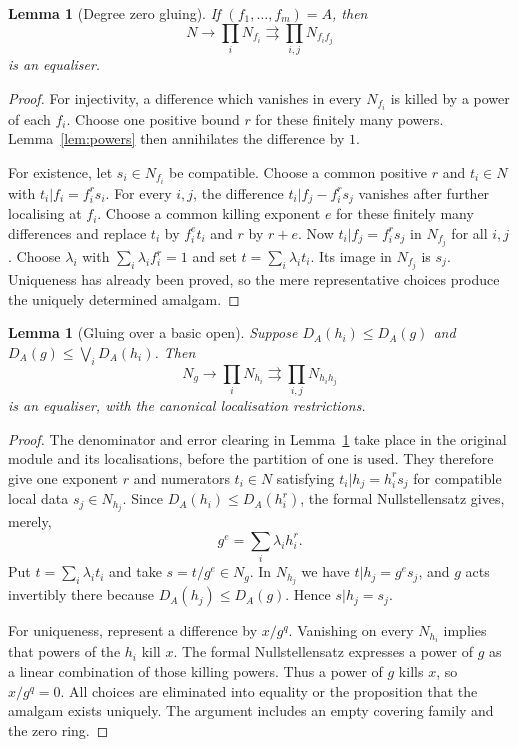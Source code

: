\documentclass[11pt]{amsart}
\newtheorem{lemma}[theorem]{Lemma}
\theoremstyle{definition}\newtheorem{definition}[theorem]{Definition}
\theoremstyle{remark}\newtheorem{remark}[theorem]{Remark}
\begin{document}
\begin{lemma}[Degree zero gluing]\label{lem:h0}
If $(f_1,\ldots,f_m)=A$, then
\[
 N\longrightarrow\prod_i N_{f_i}
 \rightrightarrows\prod_{i,j}N_{f_i f_j}
\]
is an equaliser.
\end{lemma}
\begin{proof}
For injectivity, a difference which vanishes in every $N_{f_i}$ is
killed by a power of each $f_i$. Choose one positive bound $r$ for
these finitely many powers. Lemma~\ref{lem:powers} then annihilates
the difference by $1$.

For existence, let $s_i\in N_{f_i}$ be compatible. Choose a common
positive $r$ and $t_i\in N$ with $t_i|f_i=f_i^r s_i$.
For every $i,j$, the difference
$t_i|f_j-f_i^r s_j$ vanishes after further localising at $f_i$.
Choose a common killing exponent $e$ for these finitely many
differences and replace $t_i$ by $f_i^e t_i$ and $r$ by $r+e$.
Now $t_i|f_j=f_i^r s_j$ in $N_{f_j}$ for all $i,j$.
Choose $\lambda_i$ with $\sum_i\lambda_i f_i^r=1$ and set
$t=\sum_i\lambda_i t_i$. Its image in $N_{f_j}$ is $s_j$.
Uniqueness has already been proved, so the mere representative choices
produce the uniquely determined amalgam.
\end{proof}

\begin{lemma}[Gluing over a basic open]\label{lem:h0relative}
Suppose $D_A(h_i)\le D_A(g)$ and
$D_A(g)\le\bigvee_i D_A(h_i)$. Then
\[
 N_g\longrightarrow\prod_i N_{h_i}
 \rightrightarrows\prod_{i,j}N_{h_i h_j}
\]
is an equaliser, with the canonical localisation restrictions.
\end{lemma}
\begin{proof}
The denominator and error clearing in Lemma~\ref{lem:h0} take place
in the original module and its localisations, before the partition of
one is used. They therefore give one exponent $r$ and numerators
$t_i\in N$ satisfying $t_i|h_j=h_i^r s_j$ for compatible local data
$s_j\in N_{h_j}$. Since $D_A(h_i)\le D_A(h_i^r)$, the formal
Nullstellensatz gives, merely,
\[
 g^e=\sum_i\lambda_i h_i^r.
\]
Put $t=\sum_i\lambda_i t_i$ and take $s=t/g^e\in N_g$.
In $N_{h_j}$ we have $t|h_j=g^e s_j$, and $g$ acts invertibly
there because $D_A(h_j)\le D_A(g)$. Hence $s|h_j=s_j$.

For uniqueness, represent a difference by $x/g^q$. Vanishing on
every $N_{h_i}$ implies that powers of the $h_i$ kill $x$.
The formal Nullstellensatz expresses a power of $g$ as a linear
combination of those killing powers. Thus a power of $g$ kills $x$,
so $x/g^q=0$. All choices are eliminated into equality or the
proposition that the amalgam exists uniquely. The argument includes
an empty covering family and the zero ring.
\end{proof}
\end{document}
